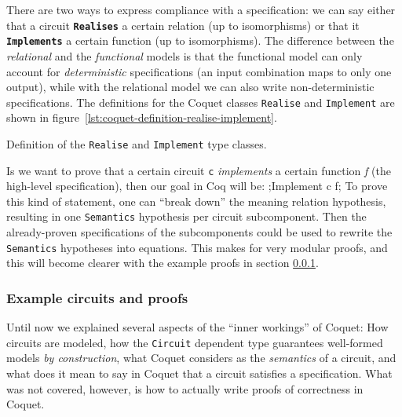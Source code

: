             There are two ways to express compliance with a specification: we can say either that a
            circuit \texttt{\textbf{Realises}} a certain relation (up to isomorphisms) or that it
            \texttt{\textbf{Implements}} a certain function (up to isomorphisms). The difference
            between the \emph{relational} and the \emph{functional} models is that the functional
            model can only account for \emph{deterministic} specifications (an input combination
            maps to only one output), while with the relational model we can also write
            non-deterministic specifications. The definitions for the Coquet classes
            \texttt{Realise} and \texttt{Implement} are shown in
            figure~\ref{lst:coquet-definition-realise-implement}.

            \begin{listing}[h!]
                \caption{Definition of the \texttt{Realise} and \texttt{Implement} type classes.
                    \label{lst:coquet-definition-realise-implement}}
            \end{listing}

            Is we want to prove that a certain circuit \texttt{c} \emph{implements} a certain
            function \emph{f} (the high-level specification), then our goal in Coq will be:
            \coq;Implement c f; To prove this kind of statement, one can ``break down'' the meaning
            relation hypothesis, resulting in one \texttt{Semantics} hypothesis per circuit
            subcomponent.  Then the already-proven specifications of the subcomponents could be used
            to rewrite the \texttt{Semantics} hypotheses into equations. This makes for very modular
            proofs, and this will become clearer with the example proofs in section
            \ref{subsubsec:coquet-circuits}.


        \subsubsection{Example circuits and proofs}
        \label{subsubsec:coquet-circuits}
            Until now we explained several aspects of the ``inner workings'' of Coquet: How
            circuits are modeled, how the \texttt{Circuit} dependent type guarantees well-formed
            models \emph{by construction}, what Coquet considers as the \emph{semantics} of a
            circuit, and what does it mean to say in Coquet that a circuit satisfies a
            specification. What was not covered, however, is how to actually write proofs of
            correctness in Coquet.

